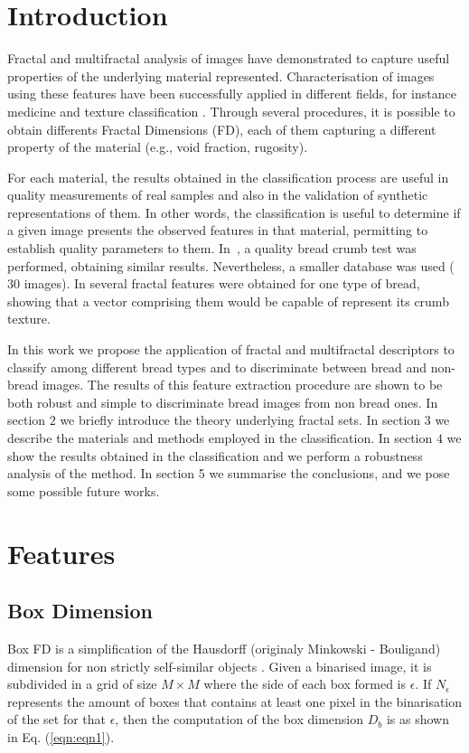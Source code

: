 \documentclass[oneside,a4paper,english,links]{amca}
\begin{document}
\section{Introduction}
Fractal and multifractal analysis of images have demonstrated to capture useful properties of the underlying material represented. Characterisation of images using these features have been successfully applied in different fields, for instance medicine \cite{Andjelkovic2008,Yu2011} and texture classification \cite{Wendt2009}. Through several procedures, it is possible to obtain differents Fractal Dimensions (FD), each of them capturing a different property of the material (e.g., void fraction, rugosity).

For each material, the results obtained in the classification process are useful in quality measurements of real samples and also in the validation of synthetic representations of them. In other words, the classification is useful to determine if a given image presents the observed features in that material, permitting to establish quality parameters to them. In~\cite{Fan2006}, a quality bread crumb test was performed, obtaining similar results. Nevertheless, a smaller database was used ($30$ images). In \cite{Gonzales2008} several fractal features were obtained for one type of bread, showing that a vector comprising them would be capable of represent its crumb texture.

In this work we propose the application of fractal and multifractal descriptors to classify among different bread types and to discriminate between bread and non-bread images. The results of this feature extraction procedure are shown to be both robust and simple to discriminate bread images from non bread ones. In section $2$ we briefly introduce the theory underlying fractal sets. In section $3$ we describe the materials and methods employed in the classification. In section $4$ we show the results obtained in the classification and we perform a robustness analysis of the method. In section 5 we summarise the conclusions, and we pose some possible future works.

\section{Features}
\subsection{Box Dimension}
Box FD is a simplification of the Hausdorff (originaly Minkowski - Bouligand) dimension for non strictly self-similar objects \cite{Peitgen2004}. Given a binarised image, it is subdivided in a grid of size $M\times M$ where the side of each box formed is $\epsilon$. If $N_{\epsilon}$ represents the amount of boxes that contains at least one pixel in the binarisation of the set for that $\epsilon$, then the computation of the box dimension  $D_{b}$ is as shown in Eq. (\ref{eqn:eqn1}).
\end{document}
